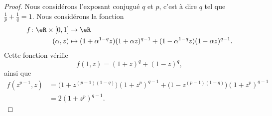 \begin{proof}
	Nous considérons l'exposant conjugué \( q\) et \( p\), c'est à dire \( q\) tel que \( \frac{1}{ p }+\frac{1}{ q }=1\). Nous considérons la fonction
	\begin{equation}
		\begin{aligned}
			f\colon \eR\times \mathopen[ 0 , 1 \mathclose] & \to \eR                                                                          \\
			(\alpha,z)                                     & \mapsto (1+\alpha^{1-q}z)(1+\alpha z)^{q-1}+(1-\alpha^{1-q}z)(1-\alpha z)^{q-1}.
		\end{aligned}
	\end{equation}
	Cette fonction vérifie
	\begin{equation}        \label{EQooRFZQooJvdocT}
		f(1,z)=(1+z)^q+(1-z)^q,
	\end{equation}
	ainsi que
	\begin{subequations}        \label{EQooISBRooHMiPRE}
		\begin{align}
			f(z^{p-1},z) & =\big( 1+z^{(p-1)(1-q)} \big)(1+z^p)^{q-1}+\big( 1-z^{(p-1)(1-q)} \big)(1+z^p)^{q-1} \\
			             & =2(1+z^p)^{q-1}.
		\end{align}
	\end{subequations}


\end{proof}
